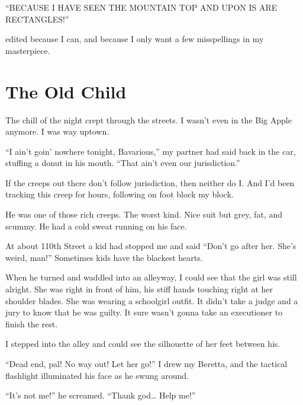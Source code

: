 ``BECAUSE I HAVE SEEN THE MOUNTAIN TOP AND UPON IS ARE
RECTANGLES!''



edited because I can, and because I only want a few misspellings in
my masterpiece. 
 



\chapter{The Old Child}



The chill of the night crept through the streets. I wasn't
even in the Big Apple anymore. I was way uptown.



``I ain't goin' nowhere tonight, Bavarious,''
my partner had said back in the car, stuffing a donut in his mouth.
``That ain't even our jurisdiction.''



If the creeps out there don't follow jurisdiction, then
neither do I. And I'd been tracking this creep for hours,
following on foot block my block.



He was one of those rich creeps. The worst kind. Nice suit but
grey, fat, and scummy. He had a cold sweat running on his
face.



At about 110th Street a kid had stopped me and said ``Don't go after
her. She's weird, man!'' Sometimes kids have the blackest
hearts.



When he turned and waddled into an alleyway, I could see that the
girl was still alright. She was right in front of him, his stiff
hands touching right at her shoulder blades. She was wearing a
schoolgirl outfit. It didn't take a judge and a jury to know
that he was guilty. It sure wasn't gonna take an executioner
to finish the rest.



I stepped into the alley and could see the silhouette of her feet
between his.



``Dead end, pal! No way out! Let her go!'' I drew my
Beretta, and the tactical flashlight illuminated his face as he
swung around.



``It's not me!'' he screamed. ``Thank god{\ldots}
Help me!''



